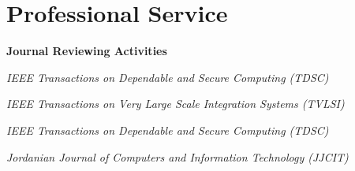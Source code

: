 \section*{Professional Service}
\begin{description}
\item \textbf{Journal Reviewing Activities}
\item \emph{IEEE Transactions on Dependable and Secure Computing (TDSC)} 
\item \emph{IEEE Transactions on Very Large Scale Integration Systems (TVLSI)} 
\item \emph{IEEE Transactions on Dependable and Secure Computing (TDSC)} 
\item \emph{Jordanian Journal of Computers and Information Technology (JJCIT)} 
\end{description}
